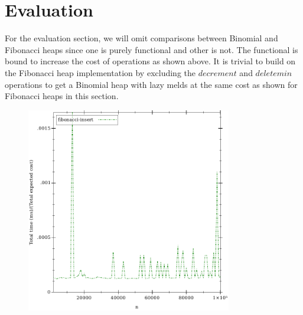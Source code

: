 \documentclass{llncs}
\begin{document}
\section{Evaluation}
For the evaluation section, we will omit comparisons between Binomial and Fibonacci heaps since one is purely functional and other is not. The functional is bound to increase the cost of operations as shown above. It is trivial to build on the Fibonacci heap implementation by excluding the $decrement$ and $deletemin$ operations to get a Binomial heap with lazy melds\cite{kozen1992design} at the same cost as shown for Fibonacci heaps in this section.

\begin{figure}
	\begin{center}
		\includegraphics[width=0.8\textwidth]{FIG/insert.pdf}
	\end{center}
	\caption{}
	\label{fig:fi_insert}
\end{figure}
\end{document}
